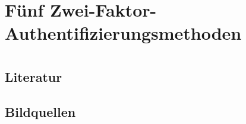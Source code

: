%
%

\section{Fünf Zwei-Faktor-Authentifizierungsmethoden}


\tucthreeheadlines{}
\section{}




\tuctwoheadlines{}
\section*{\ShortTitle}
\subsection{Literatur}
\begin{frame}
    \frametitle{\currentsectionname}
    
\end{frame}

\subsection{Bildquellen}
\begin{frame}
    \frametitle{\currentsectionname}
    \theendnotes{}
\end{frame}


